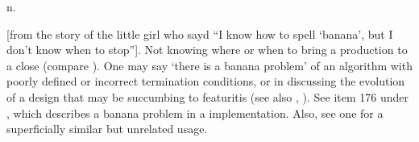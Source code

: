  n.

[from the story of the little girl who sayd ``I know how to spell `banana', but
I don't know when to stop'']. Not knowing where or when to bring a production to
a close (compare ). One may say `there is a banana
problem' of an algorithm with poorly defined or incorrect termination
conditions, or in discussing the evolution of a design that may be succumbing to
featuritis (see also , ). See item 176 under , which describes a banana
problem in a  implementation. Also, see one
 for a superficially similar but unrelated usage.

